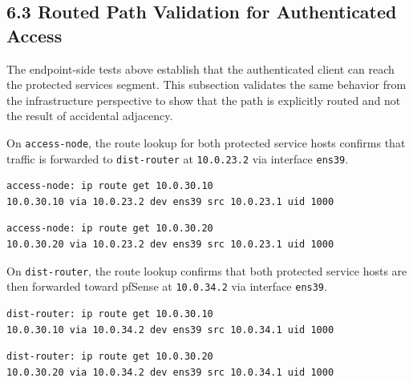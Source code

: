 \documentclass[11pt]{article}
\begin{document}

\subsection{6.3 Routed Path Validation for Authenticated Access}
\label{sec:routed-path-validation-for-authenticated-access}

The endpoint-side tests above establish that the authenticated client can reach the protected services segment. This subsection validates the same behavior from the infrastructure perspective to show that the path is explicitly routed and not the result of accidental adjacency.

On \texttt{access-node}, the route lookup for both protected service hosts confirms that traffic is forwarded to \texttt{dist-router} at \texttt{10.0.23.2} via interface \texttt{ens39}.

\begin{verbatim}
access-node: ip route get 10.0.30.10
10.0.30.10 via 10.0.23.2 dev ens39 src 10.0.23.1 uid 1000
\end{verbatim}

\begin{verbatim}
access-node: ip route get 10.0.30.20
10.0.30.20 via 10.0.23.2 dev ens39 src 10.0.23.1 uid 1000
\end{verbatim}

On \texttt{dist-router}, the route lookup confirms that both protected service hosts are then forwarded toward pfSense at \texttt{10.0.34.2} via interface \texttt{ens39}.

\begin{verbatim}
dist-router: ip route get 10.0.30.10
10.0.30.10 via 10.0.34.2 dev ens39 src 10.0.34.1 uid 1000
\end{verbatim}

\begin{verbatim}
dist-router: ip route get 10.0.30.20
10.0.30.20 via 10.0.34.2 dev ens39 src 10.0.34.1 uid 1000
\end{verbatim}
\end{document}

